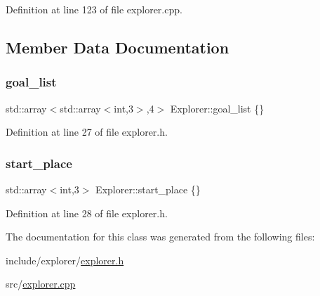 Definition at line 123 of file explorer.\+cpp.



\subsection{Member Data Documentation}
\mbox{\label{class_explorer_acda1856f421dfe836f39de446415b969}} 
\subsubsection{\texorpdfstring{goal\+\_\+list}{goal\_list}}
{\footnotesize\ttfamily std\+::array$<$std\+::array$<$int,3$>$,4$>$ Explorer\+::goal\+\_\+list \{\}}



Definition at line 27 of file explorer.\+h.

\mbox{\label{class_explorer_af1aee46522a58db39d3643f2138c76fa}} 
\subsubsection{\texorpdfstring{start\+\_\+place}{start\_place}}
{\footnotesize\ttfamily std\+::array$<$int,3$>$ Explorer\+::start\+\_\+place \{\}}



Definition at line 28 of file explorer.\+h.



The documentation for this class was generated from the following files\+:\begin{DoxyCompactItemize}
\item 
include/explorer/\hyperlink{explorer_8h}{explorer.\+h}\item 
src/\hyperlink{explorer_8cpp}{explorer.\+cpp}\end{DoxyCompactItemize}
